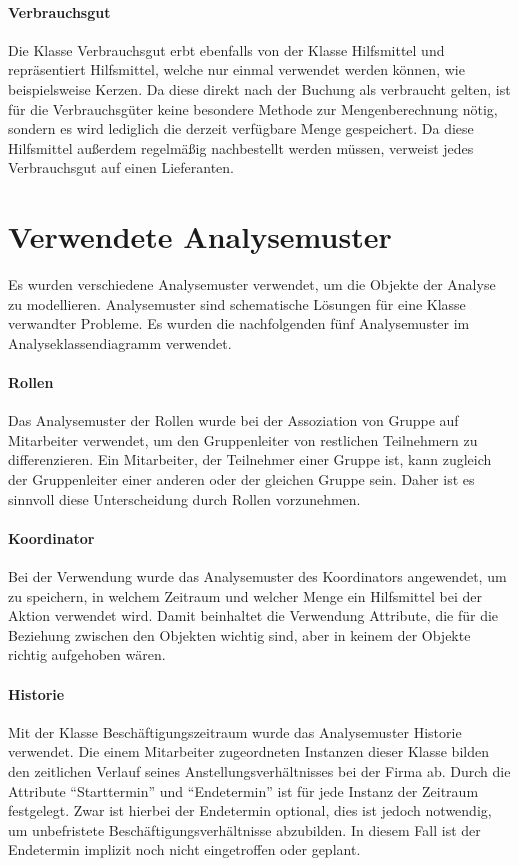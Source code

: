 \paragraph{Verbrauchsgut}
Die Klasse Verbrauchsgut erbt ebenfalls von der Klasse Hilfsmittel und repräsentiert Hilfsmittel, welche nur einmal verwendet werden können, wie beispielsweise Kerzen. Da diese direkt nach der Buchung als verbraucht gelten, ist für die Verbrauchsgüter keine besondere Methode zur Mengenberechnung nötig, sondern es wird lediglich die derzeit verfügbare Menge gespeichert. Da diese Hilfsmittel außerdem regelmäßig nachbestellt werden müssen, verweist jedes Verbrauchsgut auf einen Lieferanten.

\section{Verwendete Analysemuster}
Es wurden verschiedene Analysemuster verwendet, um die Objekte der Analyse zu modellieren. Analysemuster sind schematische Lösungen für eine Klasse verwandter Probleme. Es wurden die nachfolgenden fünf Analysemuster im Analyseklassendiagramm verwendet.
\paragraph{Rollen}
Das Analysemuster der Rollen wurde bei der Assoziation von Gruppe auf Mitarbeiter verwendet, um den Gruppenleiter von restlichen Teilnehmern zu differenzieren. Ein Mitarbeiter, der Teilnehmer einer Gruppe ist, kann zugleich der Gruppenleiter einer anderen oder der gleichen Gruppe sein. Daher ist es sinnvoll diese Unterscheidung durch Rollen vorzunehmen.

\paragraph{Koordinator}
Bei der Verwendung wurde das Analysemuster des Koordinators angewendet, um zu speichern, in welchem Zeitraum und welcher Menge ein Hilfsmittel bei der Aktion verwendet wird. Damit beinhaltet die Verwendung Attribute, die für die Beziehung zwischen den Objekten wichtig sind, aber in keinem der Objekte richtig aufgehoben wären.

\paragraph{Historie}
Mit der Klasse Beschäftigungszeitraum wurde das Analysemuster Historie verwendet. Die einem Mitarbeiter zugeordneten Instanzen dieser Klasse bilden den zeitlichen Verlauf seines Anstellungsverhältnisses bei der Firma ab. Durch die Attribute \enquote{Starttermin} und \enquote{Endetermin} ist für jede Instanz der Zeitraum festgelegt. Zwar ist hierbei der Endetermin optional, dies ist jedoch notwendig, um unbefristete Beschäftigungsverhältnisse abzubilden. In diesem Fall ist der Endetermin implizit noch nicht eingetroffen oder geplant.   

